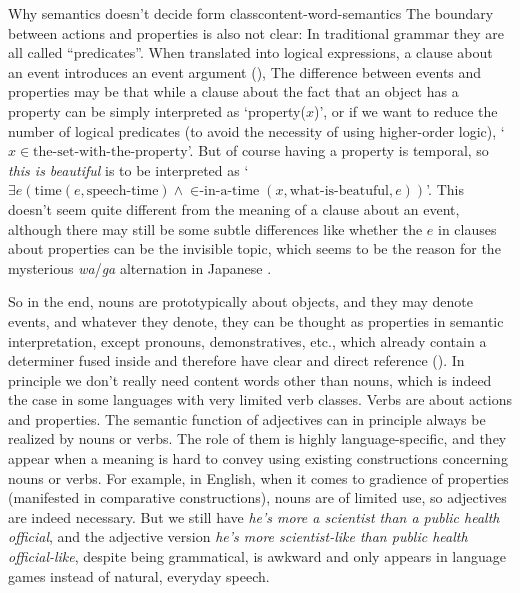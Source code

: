 \documentclass[UTF8, a4paper, oneside, scheme=plain]{ctexrep}
\newcommand{\corpus}[1]{\emph{#1}}
\newcommand{\translate}[1]{`#1'}
\begin{document}
\begin{theorybox}{Why semantics doesn't decide form class}{content-word-semantics}
    The boundary between actions and properties is also not clear:
    In traditional grammar they are all called ``predicates''.
    When translated into logical expressions,
    a clause about an event introduces an event argument (),
    The difference between events and properties may be that
    while a clause about the fact that an object has a property 
    can be simply interpreted as \translate{property($x$)},
    or if we want to reduce the number of logical predicates 
    (to avoid the necessity of using higher-order logic),
    \translate{$x \in \text{the-set-with-the-property}$}.
    But of course having a property is temporal,
    so \corpus{this is beautiful} is to be interpreted as 
    \translate{$\exists e (\text{time}(e, \text{speech-time}) \land 
    \text{$\in$-in-a-time}(x, \text{what-is-beatuful}, e) )$}.
    This doesn't seem quite different from the meaning of a clause about an event,
    although there may still be some subtle differences like 
    whether the $e$ in clauses about properties can be the invisible topic, 
    which seems to be the reason for the mysterious \corpus{wa}/\corpus{ga} alternation in Japanese
    \citep{heycock2008}.

    So in the end,
    nouns are prototypically about objects,
    and they may denote events, 
    and whatever they denote, they can be thought as properties in semantic interpretation,
    except pronouns, demonstratives, etc., 
    which already contain a determiner fused inside 
    and therefore have clear and direct reference ().
    In principle we don't really need content words other than nouns,
    which is indeed the case in some languages
    with very limited verb classes.
    Verbs are about actions and properties.
    The semantic function of adjectives can in principle always be realized by nouns or verbs.
    The role of them is highly language-specific,
    and they appear when a meaning is hard to convey using existing constructions concerning nouns or verbs.
    For example, in English, when it comes to gradience of properties
    (manifested in comparative constructions),
    nouns are of limited use,
    so adjectives are indeed necessary.
    But we still have \corpus{he's more a scientist than a public health official},
    and the adjective version \corpus{he's more scientist-like than public health official-like},
    despite being grammatical, is awkward
    and only appears in language games instead of natural, everyday speech.
\end{theorybox}
\end{document}
